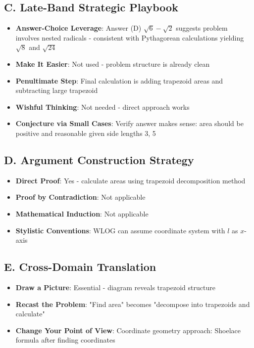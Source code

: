 \documentclass[]{article}
\begin{document}
\begin{strategicbox}
\subsection*{C. Late-Band Strategic Playbook}
\begin{itemize}[leftmargin=*]
    \item \textbf{Answer-Choice Leverage}: Answer (D) $\sqrt{6} - \sqrt{2}$ suggests problem involves nested radicals - consistent with Pythagorean calculations yielding $\sqrt{8}$ and $\sqrt{24}$
    \item \textbf{Make It Easier}: Not used - problem structure is already clean
    \item \textbf{Penultimate Step}: Final calculation is adding trapezoid areas and subtracting large trapezoid
    \item \textbf{Wishful Thinking}: Not needed - direct approach works
    \item \textbf{Conjecture via Small Cases}: Verify answer makes sense: area should be positive and reasonable given side lengths 3, 5
\end{itemize}

\subsection*{D. Argument Construction Strategy}
\begin{itemize}[leftmargin=*]
    \item \textbf{Direct Proof}: Yes - calculate areas using trapezoid decomposition method
    \item \textbf{Proof by Contradiction}: Not applicable
    \item \textbf{Mathematical Induction}: Not applicable
    \item \textbf{Stylistic Conventions}: WLOG can assume coordinate system with $l$ as $x$-axis
\end{itemize}

\subsection*{E. Cross-Domain Translation}
\begin{itemize}[leftmargin=*]
    \item \textbf{Draw a Picture}: Essential - diagram reveals trapezoid structure
    \item \textbf{Recast the Problem}: "Find area" becomes "decompose into trapezoids and calculate"
    \item \textbf{Change Your Point of View}: Coordinate geometry approach: Shoelace formula after finding coordinates
\end{itemize}
\end{strategicbox}
\end{document}
